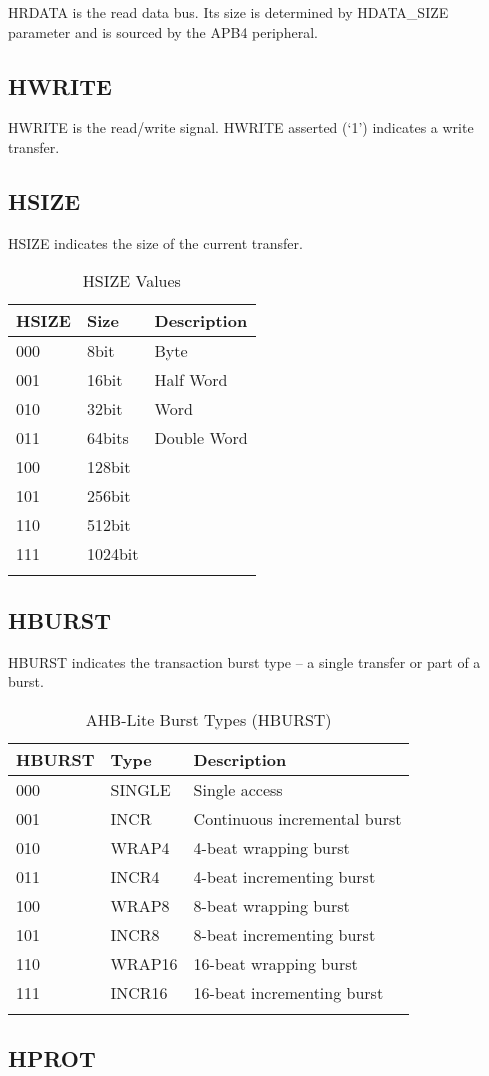 HRDATA is the read data bus. Its size is determined by HDATA\_SIZE
parameter and is sourced by the APB4 peripheral.

 \subsection{HWRITE}\label{hwrite}

HWRITE is the read/write signal. HWRITE asserted (`1') indicates a write
transfer.

 \subsection{HSIZE}\label{hsize}

HSIZE indicates the size of the current transfer.

\begin{longtable}[]{@{}lll@{}}
	\toprule
	HSIZE & Size & Description\tabularnewline
	\midrule
	\endhead
	000 & 8bit & Byte\tabularnewline
	001 & 16bit & Half Word\tabularnewline
	010 & 32bit & Word\tabularnewline
	011 & 64bits & Double Word\tabularnewline
	100 & 128bit &\tabularnewline
	101 & 256bit &\tabularnewline
	110 & 512bit &\tabularnewline
	111 & 1024bit &\tabularnewline
	\bottomrule
	\caption{HSIZE Values}
\end{longtable}

 \subsection{HBURST}\label{hburst}

HBURST indicates the transaction burst type -- a single transfer or part
of a burst.

\begin{longtable}[]{@{}lll@{}}
	\toprule
	HBURST & Type & Description\tabularnewline
	\midrule
	\endhead
	000 & SINGLE & Single access\tabularnewline
	001 & INCR & Continuous incremental burst\tabularnewline
	010 & WRAP4 & 4-beat wrapping burst\tabularnewline
	011 & INCR4 & 4-beat incrementing burst\tabularnewline
	100 & WRAP8 & 8-beat wrapping burst\tabularnewline
	101 & INCR8 & 8-beat incrementing burst\tabularnewline
	110 & WRAP16 & 16-beat wrapping burst\tabularnewline
	111 & INCR16 & 16-beat incrementing burst\tabularnewline
	\bottomrule
	\caption{AHB-Lite Burst Types (HBURST)}
\end{longtable}

 \subsection{HPROT}\label{hprot}

